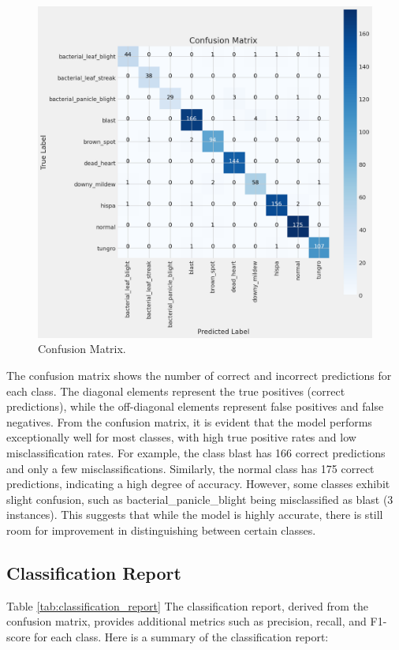 \documentclass[conference]{IEEEtran}
\begin{document}
\begin{figure}[H]
    \centerline{\includegraphics[width=\linewidth]{fig5.png}}
    \caption{Confusion Matrix.}
    \label{fig5}
\end{figure}

The confusion matrix shows the number of correct and incorrect predictions for each class. The diagonal elements represent the true positives (correct predictions), while the off-diagonal elements represent false positives and false negatives.
From the confusion matrix, it is evident that the model performs exceptionally well for most classes, with high true positive rates and low misclassification rates. For example, the class blast has 166 correct predictions and only a few misclassifications. Similarly, the normal class has 175 correct predictions, indicating a high degree of accuracy.
However, some classes exhibit slight confusion, such as bacterial\_panicle\_blight being misclassified as blast (3 instances). This suggests that while the model is highly accurate, there is still room for improvement in distinguishing between certain classes.

\subsection{Classification Report}
Table \ref{tab:classification_report} The classification report, derived from the confusion matrix, provides additional metrics such as precision, recall, and F1-score for each class. Here is a summary of the classification report:
\end{document}

